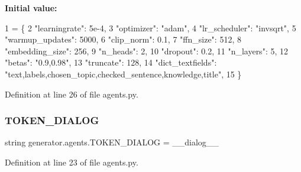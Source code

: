 {\bfseries Initial value\+:}
\begin{DoxyCode}
1 =  \{
2     \textcolor{stringliteral}{"learningrate"}: 5e-4,
3     \textcolor{stringliteral}{"optimizer"}: \textcolor{stringliteral}{"adam"},
4     \textcolor{stringliteral}{"lr\_scheduler"}: \textcolor{stringliteral}{"invsqrt"},
5     \textcolor{stringliteral}{"warmup\_updates"}: 5000,
6     \textcolor{stringliteral}{"clip\_norm"}: 0.1,
7     \textcolor{stringliteral}{"ffn\_size"}: 512,
8     \textcolor{stringliteral}{"embedding\_size"}: 256,
9     \textcolor{stringliteral}{"n\_heads"}: 2,
10     \textcolor{stringliteral}{"dropout"}: 0.2,
11     \textcolor{stringliteral}{"n\_layers"}: 5,
12     \textcolor{stringliteral}{"betas"}: \textcolor{stringliteral}{"0.9,0.98"},
13     \textcolor{stringliteral}{"truncate"}: 128,
14     \textcolor{stringliteral}{"dict\_textfields"}: \textcolor{stringliteral}{"text,labels,chosen\_topic,checked\_sentence,knowledge,title"},
15 \}
\end{DoxyCode}


Definition at line 26 of file agents.\+py.

\mbox{\label{namespacegenerator_1_1agents_a2570342ffe252995531fe5570e32a9ea}} 
\subsubsection{\texorpdfstring{T\+O\+K\+E\+N\+\_\+\+D\+I\+A\+L\+OG}{TOKEN\_DIALOG}}
{\footnotesize\ttfamily string generator.\+agents.\+T\+O\+K\+E\+N\+\_\+\+D\+I\+A\+L\+OG = \textquotesingle{}\+\_\+\+\_\+dialog\+\_\+\+\_\+\textquotesingle{}}



Definition at line 23 of file agents.\+py.

